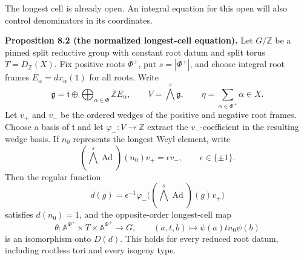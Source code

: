\documentclass[11pt,a4paper,openany]{report}
\begin{document}
The longest cell is already open. An integral equation for this open will also control denominators in its coordinates.

\textbf{Proposition 8.2 (the normalized longest-cell equation).} Let \(G/\mathbb Z\) be a pinned split reductive group with constant root datum and split torus \(T=D_{\mathbb Z}(X)\). Fix positive roots \(\Phi^+\), put \(s=|\Phi^+|\), and choose integral root frames \(E_\alpha=dx_\alpha(1)\) for all roots. Write \[
\mathfrak g=\mathfrak t\oplus\bigoplus_{\alpha\in\Phi}\mathbb ZE_\alpha,
\qquad V=\bigwedge^s\mathfrak g,
\qquad \eta=\sum_{\alpha\in\Phi^+}\alpha\in X.
\] Let \(v_+\) and \(v_-\) be the ordered wedges of the positive and negative root frames. Choose a basis of \(\mathfrak t\) and let \(\varphi_-:V\to\mathbb Z\) extract the \(v_-\)-coefficient in the resulting wedge basis. If \(n_0\) represents the longest Weyl element, write \[
(\bigwedge^s\operatorname{Ad})(n_0)v_+=\epsilon v_-,
\qquad\epsilon\in\{\pm1\}.
\] Then the regular function \[
d(g)=\epsilon^{-1}\varphi_-\bigl((\bigwedge^s\operatorname{Ad})(g)v_+\bigr)
\] satisfies \(d(n_0)=1\), and the opposite-order longest-cell map \[
\theta:\mathbb A^{\Phi^+}\times T\times\mathbb A^{\Phi^+}\longrightarrow G,
\qquad(a,t,b)\longmapsto\psi(a)t n_0\psi(b)
\] is an isomorphism onto \(D(d)\). This holds for every reduced root datum, including rootless tori and every isogeny type.
\end{document}
